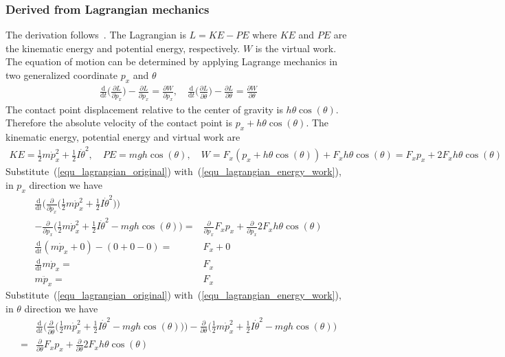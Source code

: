 \documentclass[12pt]{article}
\begin{document}
\subsubsection{Derived from Lagrangian mechanics}
The derivation follows~\cite{peacock_2007_mit_lagrange}.
The Lagrangian is $L=KE-PE$ where $KE$ and $PE$ are the
kinematic energy and potential energy, respectively.
$W$ is the virtual work.
The equation of motion can be determined by applying
Lagrange mechanics in two generalized coordinate $p_x$ and $\theta$
\begin{align}
\label{equ_lagrangian_original}
\frac{\mathrm{d}}{\mathrm{d}t}\bigg(
\frac{\partial L}{\partial \dot{p}_x}\bigg)
-\frac{\partial L}{\partial p_x}=
\frac{\partial W}{\partial p_x}, \quad
\frac{\mathrm{d}}{\mathrm{d}t}\bigg(
\frac{\partial L}{\partial \dot{\theta}}\bigg)
-\frac{\partial L}{\partial \theta}=
\frac{\partial W}{\partial \theta}
\end{align}
The contact point displacement relative to the center of gravity is
$h\theta \cos(\theta)$. Therefore the absolute velocity of
the contact point is $p_x + h\theta \cos(\theta)$.
The kinematic energy, potential energy and virtual work are
\begin{align}
KE = \frac{1}{2}m\dot{p}_x^2
+\frac{1}{2}I\dot{\theta}^2,\quad
PE = mgh\cos(\theta), \quad
W = F_x (p_x+ h\theta \cos(\theta)) + F_x h \theta \cos(\theta)
= F_x p_x + 2F_x h \theta \cos(\theta)
\label{equ_lagrangian_energy_work}
\end{align}
Substitute~(\ref{equ_lagrangian_original})
with~(\ref{equ_lagrangian_energy_work}), in $p_x$ direction we have
\begin{align}
\frac{\mathrm{d}}{\mathrm{d}t}\bigg(
\frac{\partial}{\partial \dot{p}_x}\bigg(
\frac{1}{2}m\dot{p}_x^2 + \frac{1}{2}I\dot{\theta}^2\bigg)\bigg) \quad &\\
-\frac{\partial}{\partial p_x}\bigg(
\frac{1}{2}m\dot{p}_x^2+\frac{1}{2}I\dot{\theta}^2
-mgh\cos(\theta)\bigg)=&
\frac{\partial}{\partial p_x}F_x p_x
+\frac{\partial}{\partial p_x} 2F_x h \theta \cos(\theta) \\
\frac{\mathrm{d}}{\mathrm{d}t}
(m\dot{p}_x + 0)
-(0+0-0)=&
F_x + 0\\
\frac{\mathrm{d}}{\mathrm{d}t}
m\dot{p}_x = & F_x \\
m\ddot{p}_x =& F_x
\end{align}
Substitute~(\ref{equ_lagrangian_original})
with~(\ref{equ_lagrangian_energy_work}), in $\theta$ direction we have
\begin{align}
&\frac{\mathrm{d}}{\mathrm{d}t}\bigg(
\frac{\partial}{\partial\dot{\theta}}\bigg(
\frac{1}{2}m\dot{p}_x^2+\frac{1}{2}I\dot{\theta}^2
-mgh\cos(\theta)\bigg)\bigg)
-\frac{\partial}{\partial \theta}\bigg(
\frac{1}{2}m\dot{p}_x^2+\frac{1}{2}I\dot{\theta}^2
-mgh\cos(\theta)\bigg)  \\
=&\frac{\partial}{\partial \theta}F_x p_x
+\frac{\partial}{\partial \theta} 2F_x h \theta \cos(\theta) 
\end{align}
\end{document}
